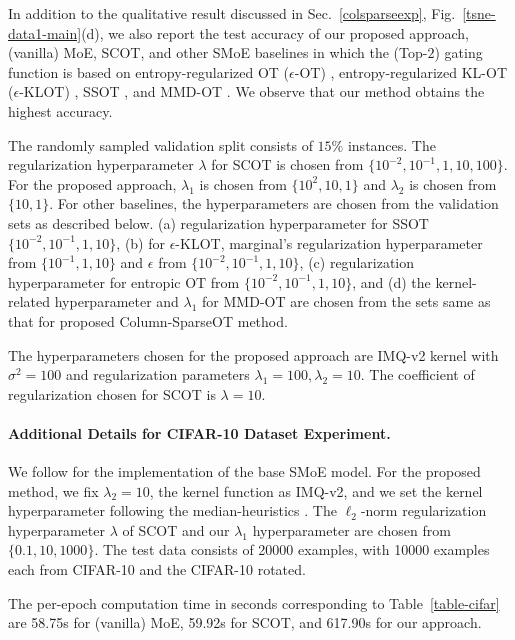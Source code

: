In addition to the qualitative result discussed in Sec.~\ref{colsparseexp}, Fig.~\ref{tsne-data1-main}(d), we also report the test accuracy of our proposed approach, (vanilla) MoE, SCOT, and other SMoE baselines in which the (Top-$2$) gating function is based on entropy-regularized OT ($\epsilon$-OT) \citep{cuturi13a}, entropy-regularized KL-OT ($\epsilon$-KLOT) \citep{chizat17}, SSOT \citep{blondel18a}, and MMD-OT \citep{mmd-uot}. We observe that our method obtains the highest accuracy.

The randomly sampled validation split consists of $15\%$ instances. The regularization hyperparameter $\lambda$ for SCOT is chosen from $\{10^{-2}, 10^{-1}, 1, 10, 100\}$. For the proposed approach, $\lambda_1$ is chosen from $\{10^{2}, 10, 1\}$ and $\lambda_2$ is chosen from $\{10, 1\}$. For other baselines, the hyperparameters are chosen from the validation sets as described below.
(a) regularization hyperparameter for SSOT $\{10^{-2}, 10^{-1}, 1, 10 \}$, (b) for $\epsilon$-KLOT, marginal's regularization hyperparameter from $\{10^{-1}, 1, 10 \}$ and $\epsilon$ from $\{10^{-2}, 10^{-1}, 1, 10\}$, (c) regularization hyperparameter for entropic OT from $\{10^{-2}, 10^{-1}, 1, 10 \}$, and (d) the kernel-related hyperparameter and $\lambda_1$ for MMD-OT are chosen from the sets same as that for proposed Column-SparseOT method. 

The hyperparameters chosen for the proposed approach are IMQ-v2 kernel with $\sigma^2=100$ and regularization parameters $\lambda_1=100, \lambda_2=10$. The coefficient of regularization chosen for SCOT is $\lambda=10$.

\paragraph{Additional Details for CIFAR-10 Dataset Experiment.}
We follow \citet{chen2022towards} for the implementation of the base SMoE model. 
For the proposed method, we fix $\lambda_2=10$, the kernel function as IMQ-v2, and we set the kernel hyperparameter following the median-heuristics \citep{gretton12a}. The $\ell_2$-norm regularization hyperparameter $\lambda$ of SCOT and our $\lambda_1$ hyperparameter are chosen from $\{0.1, 10, 1000\}$.
The test data consists of 20000 examples, with 10000 examples each from CIFAR-10 and the CIFAR-10 rotated. 

The per-epoch computation time in seconds corresponding to Table~\ref{table-cifar} are 58.75s for (vanilla) MoE, 59.92s for SCOT, and  617.90s for our approach. 


